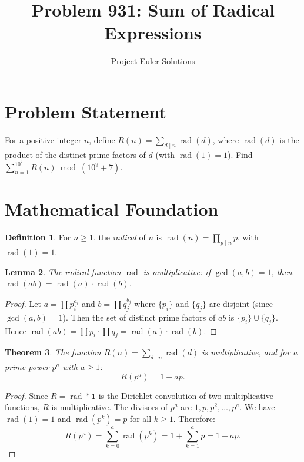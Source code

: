 \documentclass[11pt]{article}
\title{Problem 931: Sum of Radical Expressions}
\author{Project Euler Solutions}
\date{}
\newtheorem{theorem}{Theorem}
\newtheorem{lemma}[theorem]{Lemma}
\theoremstyle{definition}
\newtheorem{definition}[theorem]{Definition}
\begin{document}
\maketitle

\section{Problem Statement}

For a positive integer $n$, define $R(n) = \sum_{d \mid n} \operatorname{rad}(d)$, where $\operatorname{rad}(d)$ is the product of the distinct prime factors of $d$ (with $\operatorname{rad}(1) = 1$). Find $\sum_{n=1}^{10^7} R(n) \bmod (10^9 + 7)$.

\section{Mathematical Foundation}

\begin{definition}
For $n \geq 1$, the \emph{radical} of $n$ is $\operatorname{rad}(n) = \prod_{p \mid n} p$, with $\operatorname{rad}(1) = 1$.
\end{definition}

\begin{lemma}
The radical function $\operatorname{rad}$ is multiplicative: if $\gcd(a, b) = 1$, then $\operatorname{rad}(ab) = \operatorname{rad}(a) \cdot \operatorname{rad}(b)$.
\end{lemma}

\begin{proof}
Let $a = \prod p_i^{a_i}$ and $b = \prod q_j^{b_j}$ where $\{p_i\}$ and $\{q_j\}$ are disjoint (since $\gcd(a,b) = 1$). Then the set of distinct prime factors of $ab$ is $\{p_i\} \cup \{q_j\}$. Hence $\operatorname{rad}(ab) = \prod p_i \cdot \prod q_j = \operatorname{rad}(a) \cdot \operatorname{rad}(b)$.
\end{proof}

\begin{theorem}
The function $R(n) = \sum_{d \mid n} \operatorname{rad}(d)$ is multiplicative, and for a prime power $p^a$ with $a \geq 1$:
\[
R(p^a) = 1 + ap.
\]
\end{theorem}

\begin{proof}
Since $R = \operatorname{rad} * \mathbf{1}$ is the Dirichlet convolution of two multiplicative functions, $R$ is multiplicative. The divisors of $p^a$ are $1, p, p^2, \ldots, p^a$. We have $\operatorname{rad}(1) = 1$ and $\operatorname{rad}(p^k) = p$ for all $k \geq 1$. Therefore:
\[
R(p^a) = \sum_{k=0}^{a} \operatorname{rad}(p^k) = 1 + \sum_{k=1}^{a} p = 1 + ap.
\]
\end{proof}
\end{document}

